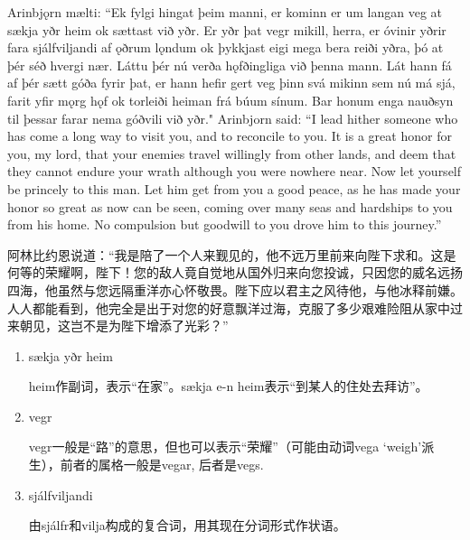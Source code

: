 \begin{paracol}{2}
    Arinbjǫrn mælti: ``Ek fylgi hingat þeim manni, er kominn er um langan veg at sækja yðr heim ok sættast við yðr. Er yðr þat vegr mikill, herra, er óvinir yðrir fara sjálfviljandi af ǫðrum lǫndum ok þykkjast eigi mega bera reiði yðra, þó at þér séð hvergi nær. Láttu þér nú verða hǫfðingliga við þenna mann. Lát hann fá af þér sætt góða fyrir þat, er hann hefir gert veg þinn svá mikinn sem nú má sjá, farit yfir mǫrg hǫf ok torleiði heiman frá búum sínum. Bar honum enga nauðsyn til þessar farar nema góðvili við yðr."
    \switchcolumn
    Arinbjorn said: ``I lead hither someone who has come a long way to visit you, and to reconcile to you. It is a great honor for you, my lord, that your enemies travel willingly from other lands, and deem that they cannot endure your wrath although you were nowhere near. Now let yourself be princely to this man. Let him get from you a good peace, as he has made your honor so great as now can be seen, coming over many seas and hardships to you from his home. No compulsion but goodwill to you drove him to this journey.''
\end{paracol}
\begin{translation*}{}
    阿林比约恩说道：“我是陪了一个人来觐见的，他不远万里前来向陛下求和。这是何等的荣耀啊，陛下！您的敌人竟自觉地从国外归来向您投诚，只因您的威名远扬四海，他虽然与您远隔重洋亦心怀敬畏。陛下应以君主之风待他，与他冰释前嫌。人人都能看到，他完全是出于对您的好意飘洋过海，克服了多少艰难险阻从家中过来朝见，这岂不是为陛下增添了光彩？”
\end{translation*}
\begin{grammar*}{}
    \begin{enumerate}[leftmargin=*]
        \item sækja yðr heim

              heim作副词，表示“在家”。sækja e-n heim表示“到某人的住处去拜访”。
        \item vegr

              vegr一般是“路”的意思，但也可以表示“荣耀”（可能由动词vega `weigh'派生），前者的属格一般是vegar, 后者是vegs.
        \item sjálfviljandi

              由sjálfr和vilja构成的复合词，用其现在分词形式作状语。

    \end{enumerate}
\end{grammar*}


